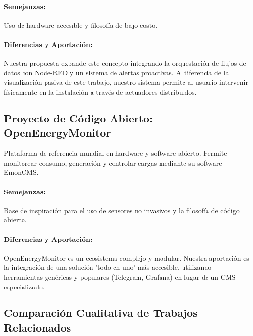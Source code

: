         \paragraph{Semejanzas:} Uso de hardware accesible y filosofía de bajo costo.
        \paragraph{Diferencias y Aportación:} Nuestra propuesta expande este concepto integrando la orquestación de flujos de datos con Node-RED y un sistema de alertas proactivas.
        A diferencia de la visualización pasiva de este trabajo, nuestro sistema permite al usuario intervenir físicamente en la instalación a través de actuadores distribuidos.
    \subsection{Proyecto de Código Abierto: OpenEnergyMonitor}
    Plataforma de referencia mundial en hardware y software abierto.
    Permite monitorear consumo, generación y controlar cargas mediante su software EmonCMS.
    \cite{openenergymonitor}

        \paragraph{Semejanzas:} Base de inspiración para el uso de sensores no invasivos y la filosofía de código abierto.
        \paragraph{Diferencias y Aportación:} OpenEnergyMonitor es un ecosistema complejo y modular.
        Nuestra aportación es la integración de una solución 'todo en uno' más accesible, utilizando herramientas genéricas y populares (Telegram, Grafana) en lugar de un CMS especializado.
    \newpage 

    \subsection{Comparación Cualitativa de Trabajos Relacionados}
    
